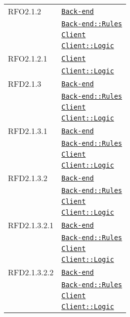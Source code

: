 \begin{longtable}{|>{\centering}m{3cm}|m{10cm}<{\centering}|}
RFO2.1.2 & \hyperref[Back-end]{\texttt{Back-end}}\\
& \hyperref[Back-end::Rules]{\texttt{Back-end::Rules}}\\
& \hyperref[Client]{\texttt{Client}}\\
& \hyperref[Client::Logic]{\texttt{Client::Logic}}\\ \hline

RFO2.1.2.1 & \hyperref[Client]{\texttt{Client}}\\
& \hyperref[Client::Logic]{\texttt{Client::Logic}}\\ \hline

RFD2.1.3 & \hyperref[Back-end]{\texttt{Back-end}}\\
& \hyperref[Back-end::Rules]{\texttt{Back-end::Rules}}\\
& \hyperref[Client]{\texttt{Client}}\\
& \hyperref[Client::Logic]{\texttt{Client::Logic}}\\ \hline

RFD2.1.3.1 & \hyperref[Back-end]{\texttt{Back-end}}\\
& \hyperref[Back-end::Rules]{\texttt{Back-end::Rules}}\\
& \hyperref[Client]{\texttt{Client}}\\
& \hyperref[Client::Logic]{\texttt{Client::Logic}}\\ \hline

RFD2.1.3.2 & \hyperref[Back-end]{\texttt{Back-end}}\\
& \hyperref[Back-end::Rules]{\texttt{Back-end::Rules}}\\
& \hyperref[Client]{\texttt{Client}}\\
& \hyperref[Client::Logic]{\texttt{Client::Logic}}\\ \hline

RFD2.1.3.2.1 & \hyperref[Back-end]{\texttt{Back-end}}\\
& \hyperref[Back-end::Rules]{\texttt{Back-end::Rules}}\\
& \hyperref[Client]{\texttt{Client}}\\
& \hyperref[Client::Logic]{\texttt{Client::Logic}}\\ \hline

RFD2.1.3.2.2 & \hyperref[Back-end]{\texttt{Back-end}}\\
& \hyperref[Back-end::Rules]{\texttt{Back-end::Rules}}\\
& \hyperref[Client]{\texttt{Client}}\\
& \hyperref[Client::Logic]{\texttt{Client::Logic}}\\ \hline


\end{longtable}
